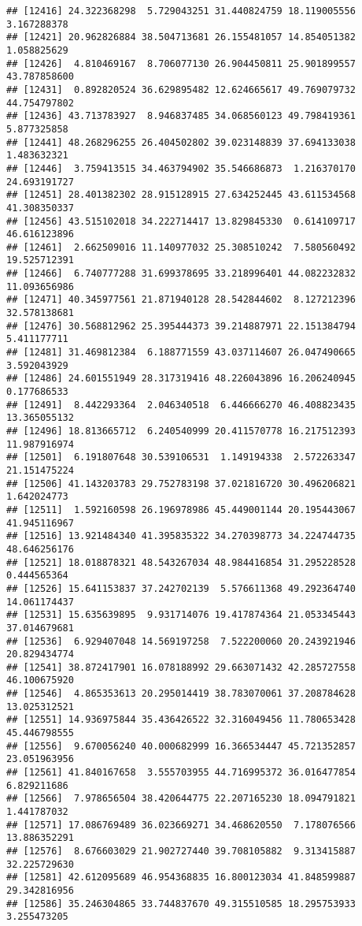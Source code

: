 \documentclass[
]{article}
\begin{document}
\begin{verbatim}
## [12416] 24.322368298  5.729043251 31.440824759 18.119005556  3.167288378
## [12421] 20.962826884 38.504713681 26.155481057 14.854051382  1.058825629
## [12426]  4.810469167  8.706077130 26.904450811 25.901899557 43.787858600
## [12431]  0.892820524 36.629895482 12.624665617 49.769079732 44.754797802
## [12436] 43.713783927  8.946837485 34.068560123 49.798419361  5.877325858
## [12441] 48.268296255 26.404502802 39.023148839 37.694133038  1.483632321
## [12446]  3.759413515 34.463794902 35.546686873  1.216370170 24.693191727
## [12451] 28.401382302 28.915128915 27.634252445 43.611534568 41.308350337
## [12456] 43.515102018 34.222714417 13.829845330  0.614109717 46.616123896
## [12461]  2.662509016 11.140977032 25.308510242  7.580560492 19.525712391
## [12466]  6.740777288 31.699378695 33.218996401 44.082232832 11.093656986
## [12471] 40.345977561 21.871940128 28.542844602  8.127212396 32.578138681
## [12476] 30.568812962 25.395444373 39.214887971 22.151384794  5.411177711
## [12481] 31.469812384  6.188771559 43.037114607 26.047490665  3.592043929
## [12486] 24.601551949 28.317319416 48.226043896 16.206240945  0.177686533
## [12491]  8.442293364  2.046340518  6.446666270 46.408823435 13.365055132
## [12496] 18.813665712  6.240540999 20.411570778 16.217512393 11.987916974
## [12501]  6.191807648 30.539106531  1.149194338  2.572263347 21.151475224
## [12506] 41.143203783 29.752783198 37.021816720 30.496206821  1.642024773
## [12511]  1.592160598 26.196978986 45.449001144 20.195443067 41.945116967
## [12516] 13.921484340 41.395835322 34.270398773 34.224744735 48.646256176
## [12521] 18.018878321 48.543267034 48.984416854 31.295228528  0.444565364
## [12526] 15.641153837 37.242702139  5.576611368 49.292364740 14.061174437
## [12531] 15.635639895  9.931714076 19.417874364 21.053345443 37.014679681
## [12536]  6.929407048 14.569197258  7.522200060 20.243921946 20.829434774
## [12541] 38.872417901 16.078188992 29.663071432 42.285727558 46.100675920
## [12546]  4.865353613 20.295014419 38.783070061 37.208784628 13.025312521
## [12551] 14.936975844 35.436426522 32.316049456 11.780653428 45.446798555
## [12556]  9.670056240 40.000682999 16.366534447 45.721352857 23.051963956
## [12561] 41.840167658  3.555703955 44.716995372 36.016477854  6.829211686
## [12566]  7.978656504 38.420644775 22.207165230 18.094791821  1.441787032
## [12571] 17.086769489 36.023669271 34.468620550  7.178076566 13.886352291
## [12576]  8.676603029 21.902727440 39.708105882  9.313415887 32.225729630
## [12581] 42.612095689 46.954368835 16.800123034 41.848599887 29.342816956
## [12586] 35.246304865 33.744837670 49.315510585 18.295753933  3.255473205

\end{verbatim}
\end{document}
